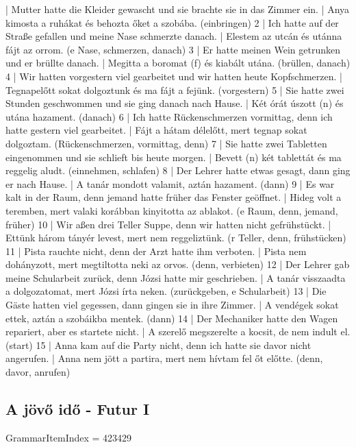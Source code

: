 \documentclass{article}
\newenvironment{exmp}{\verbatim}{\endverbatim}
\begin{document}
\begin{exmp}
1 | Mutter hatte die Kleider gewascht und sie brachte sie in das Zimmer ein. | Anya kimosta a ruhákat és behozta őket a szobába. (einbringen)
2 | Ich hatte auf der Straße gefallen und meine Nase schmerzte danach. | Elestem az utcán és utánna fájt az orrom. (e Nase, schmerzen, danach)
3 | Er hatte meinen Wein getrunken und er brüllte danach. | Megitta a boromat (f) és kiabált utána. (brüllen, danach)
4 | Wir hatten vorgestern viel gearbeitet und wir hatten heute Kopfschmerzen. | Tegnapelőtt sokat dolgoztunk és ma fájt a fejünk. (vorgestern)
5 | Sie hatte zwei Stunden geschwommen und sie ging danach nach Hause. | Két órát úszott (n) és utána hazament. (danach)
6 | Ich hatte Rückenschmerzen vormittag, denn ich hatte gestern viel gearbeitet. | Fájt a hátam délelőtt, mert tegnap sokat dolgoztam. (Rückenschmerzen, vormittag, denn)
7 | Sie hatte zwei Tabletten eingenommen und sie schlieft bis heute morgen. | Bevett (n) két tablettát és ma reggelig aludt. (einnehmen, schlafen)
8 | Der Lehrer hatte etwas gesagt, dann ging er nach Hause. | A tanár mondott valamit, aztán hazament. (dann)
9 | Es war kalt in der Raum, denn jemand hatte früher das Fenster geöffnet. | Hideg volt a teremben, mert valaki korábban kinyitotta az ablakot. (e Raum, denn, jemand, früher)
10 | Wir aßen drei Teller Suppe, denn wir hatten nicht gefrühstückt. | Ettünk három tányér levest, mert nem reggeliztünk. (r Teller, denn, frühstücken)
11 | Pista rauchte nicht, denn der Arzt hatte ihm verboten. | Pista nem dohányzott, mert megtiltotta neki az orvos. (denn, verbieten)
12 | Der Lehrer gab meine Schularbeit zurück, denn Józsi hatte mir geschrieben. | A tanár visszaadta a dolgozatomat, mert Józsi írta neken. (zurückgeben, e Schularbeit)
13 | Die Gäste hatten viel gegessen, dann gingen sie in ihre Zimmer. | A vendégek sokat ettek, aztán a szobáikba mentek. (dann)
14 | Der Mechaniker hatte den Wagen repariert, aber es startete nicht. | A szerelő megszerelte a kocsit, de nem indult el. (start)
15 | Anna kam auf die Party nicht, denn ich hatte sie davor nicht angerufen. | Anna nem jött a partira, mert nem hívtam fel őt előtte. (denn, davor, anrufen)
\end{exmp}

\subsection{A jövő idő - Futur I}

GrammarItemIndex = 423429
\end{document}
